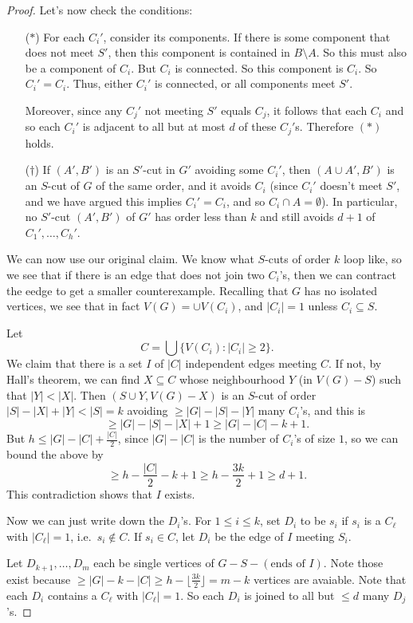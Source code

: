 \documentclass[a4paper]{article}
\begin{document}
\begin{proof}
  Let's now check the conditions:
  \begin{itemize}
    \item[($*$)] For each $C_i'$, consider its components. If there is some component that does not meet $S'$, then this component is contained in $B \setminus A$. So this must also be a component of $C_i$. But $C_i$ is connected. So this component is $C_i$. So $C_i' = C_i$. Thus, either $C_i'$ is connected, or all components meet $S'$.
      
      Moreover, since any $C_j'$ not meeting $S'$ equals $C_j$, it follows that each $C_i$ and so each $C_i'$ is adjacent to all but at most $d$ of these $C_j'$s. Therefore $(*)$ holds.

    \item[($\dagger$)] If $(A', B')$ is an $S'$-cut in $G'$ avoiding some $C_i'$, then $(A \cup A', B')$ is an $S$-cut of $G$ of the same order, and it avoids $C_i$ (since $C_i'$ doesn't meet $S'$, and we have argued this implies $C_i' = C_i$, and so $C_i \cap A = \emptyset$). In particular, no $S'$-cut $(A', B')$ of $G'$ has order less than $k$ and still avoids $d + 1$ of $C_1', \ldots, C_h'$.
  \end{itemize}

  \separator

  We can now use our original claim. We know what $S$-cuts of order $k$ loop like, so we see that if there is an edge that does not join two $C_i$'s, then we can contract the eedge to get a smaller counterexample. Recalling that $G$ has no isolated vertices, we see that in fact $V(G) = \cup V(C_i)$, and $|C_i| = 1$ unless $C_i \subseteq S$.

  Let
  \[
    C = \bigcup \{V(C_i): |C_i| \geq 2\}.
  \]
  We claim that there is a set $I$ of $|C|$ independent edges meeting $C$. If not, by Hall's theorem, we can find $X \subseteq C$ whose neighbourhood $Y$ (in $V(G) - S$) such that $|Y| < |X|$. Then $(S \cup Y, V(G) - X)$ is an $S$-cut of order $|S| - |X| + |Y| < |S| = k$ avoiding $\geq |G| - |S| - |Y|$ many $C_i$'s, and this is
  \[
    \geq |G| - |S| - |X| + 1 \geq |G| - |C| - k + 1.
  \]
  But $h \leq |G| - |C| + \frac{|C|}{2}$, since $|G| - |C|$ is the number of $C_i$'s of size $1$, so we can bound the above by
  \[
    \geq h - \frac{|C|}{2} - k + 1 \geq h - \frac{3k}{2} + 1 \geq d + 1.
  \]
  This contradiction shows that $I$ exists.

  Now we can just write down the $D_i$'s. For $1 \leq i \leq k$, set $D_i$ to be $s_i$ if $s_i$ is a $C_\ell$ with $|C_\ell| = 1$, i.e.\ $s_i \not \in C$. If $s_i \in C$, let $D_i$ be the edge of $I$ meeting $S_i$.

  Let $D_{k + 1}, \ldots, D_m$ each be single vertices of $G - S - (\text{ends of }I)$. Note those exist because $\geq |G| - k - |C| \geq h - \lfloor \frac{3k}{2}\rfloor = m - k$ vertices are avaiable. Note that each $D_i$ contains a $C_\ell$ with $|C_\ell| = 1$. So each $D_i$ is joined to all but $\leq d$ many $D_j$'s.
\end{proof}
\end{document}
